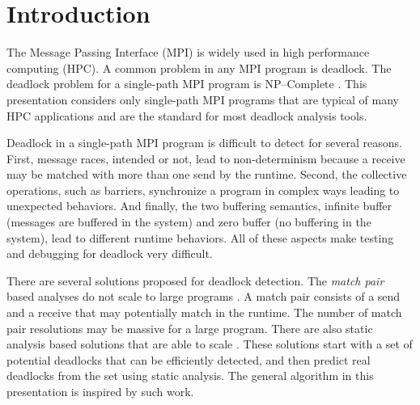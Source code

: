 \section{Introduction}

The Message Passing Interface (MPI) is widely used in high performance computing (HPC). A common problem in any MPI program is deadlock. The deadlock problem for a single-path MPI program is NP--Complete \cite{DBLP:conf/fm/ForejtKNS14}.
This presentation considers only single-path MPI programs that are typical of many HPC applications and are the standard for most deadlock analysis tools.  

Deadlock in a single-path MPI program is difficult to detect for several reasons. First, message races, intended or not, lead to non-determinism because a receive may be matched with more than one send by the runtime. Second, the collective operations, such as barriers, synchronize a program in complex ways leading to unexpected behaviors. And finally, the two buffering semantics, infinite buffer (messages are buffered in the system) and zero buffer (no buffering in the system), lead to different runtime behaviors. All of these aspects make testing and debugging for deadlock very difficult. 

There are several solutions proposed for deadlock detection. The \emph{match pair} based analyses do not scale to large programs \cite{DBLP:conf/ppopp/VakkalankaSGK08, DBLP:conf/sbmf/SharmaGB12, DBLP:conf/fm/ForejtKNS14}. A match pair consists of a send and a receive that may potentially match in the runtime. The number of match pair resolutions may be massive for a large program.
There are also static analysis based solutions that are able to scale \cite{DBLP:conf/sc/SharmaGB12, DBLP:conf/pldi/JoshiPSN09, Subodh:Dissertation}. These solutions start with a set of potential deadlocks that can be efficiently detected, and then predict real deadlocks from the set using static analysis.
The general algorithm in this presentation is inspired by such work.

